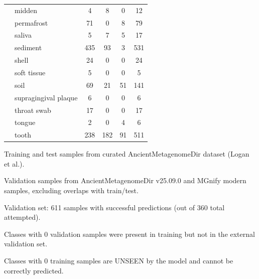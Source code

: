 \begin{table}[!t]
\begin{tabular*}{\textwidth}{@{\extracolsep{\fill}}llcccc@{\extracolsep{\fill}}}
 & midden & 4 & 8 & 0 & 12 \\
 & permafrost & 71 & 0 & 8 & 79 \\
 & saliva & 5 & 7 & 5 & 17 \\
 & sediment & 435 & 93 & 3 & 531 \\
 & shell & 24 & 0 & 0 & 24 \\
 & soft tissue & 5 & 0 & 0 & 5 \\
 & soil & 69 & 21 & 51 & 141 \\
 & supragingival plaque & 6 & 0 & 0 & 6 \\
 & throat swab & 17 & 0 & 0 & 17 \\
 & tongue & 2 & 0 & 4 & 6 \\
 & tooth & 238 & 182 & 91 & 511 \\
\bottomrule
\end{tabular*}
\begin{tablenotes}
\item Training and test samples from curated AncientMetagenomeDir dataset (Logan et al.).
\item Validation samples from AncientMetagenomeDir v25.09.0 and MGnify modern samples, excluding overlaps with train/test.
\item Validation set: 611 samples with successful predictions (out of 360 total attempted).
\item Classes with 0 validation samples were present in training but not in the external validation set.
\item Classes with 0 training samples are UNSEEN by the model and cannot be correctly predicted.
\end{tablenotes}
\end{table}